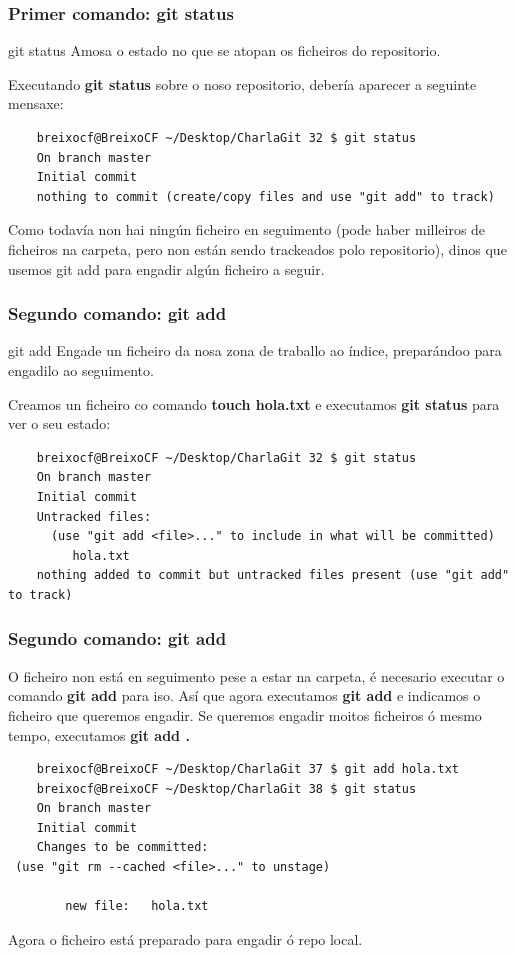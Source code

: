 \begin{frame}[fragile]
	\frametitle{Primer comando: git status}
	\begin{block}{git status}
		Amosa o estado no que se atopan os ficheiros do repositorio.
	\end{block}
	Executando \textbf{git status} sobre o noso repositorio, debería aparecer a seguinte mensaxe:
	\tiny
	\begin{verbatim}
	breixocf@BreixoCF ~/Desktop/CharlaGit 32 $ git status
	On branch master
	Initial commit
	nothing to commit (create/copy files and use "git add" to track)
	\end{verbatim}
	\small Como todavía non hai ningún ficheiro en seguimento (pode haber milleiros de ficheiros na carpeta, pero non están sendo trackeados polo repositorio), dinos que usemos git add para engadir algún ficheiro a seguir.
\end{frame}

\begin{frame}[fragile]
	\frametitle{Segundo comando: git add}
	\begin{block}{git add}
		Engade un ficheiro da nosa zona de traballo ao índice, preparándoo para engadilo ao seguimento.
	\end{block}
	\small
	Creamos un ficheiro co comando \textbf{touch hola.txt} e executamos \textbf{git status} para ver o seu estado:
	\tiny
	\begin{verbatim}
	breixocf@BreixoCF ~/Desktop/CharlaGit 32 $ git status
	On branch master
	Initial commit
	Untracked files:
	  (use "git add <file>..." to include in what will be committed)
	     hola.txt
	nothing added to commit but untracked files present (use "git add" to track)
	\end{verbatim}
\end{frame}

\begin{frame}[fragile]
	\frametitle{Segundo comando: git add}
	O ficheiro non está en seguimento pese a estar na carpeta, é necesario executar o comando \textbf{git add} para iso. Así que agora executamos \textbf{git add} e indicamos o ficheiro que queremos engadir. Se queremos engadir moitos ficheiros ó mesmo tempo, executamos \textbf{git add .}
	\tiny 
	\begin{verbatim}
	breixocf@BreixoCF ~/Desktop/CharlaGit 37 $ git add hola.txt 
	breixocf@BreixoCF ~/Desktop/CharlaGit 38 $ git status
	On branch master
	Initial commit
	Changes to be committed:
 (use "git rm --cached <file>..." to unstage)
	
		new file:   hola.txt
	\end{verbatim}
	\small
	Agora o ficheiro está preparado para engadir ó repo local.
\end{frame}

